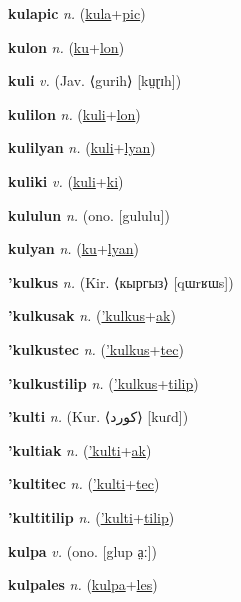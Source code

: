 \textbf{\hypertarget{kulapic}{kulapic}} \textit{n.} (\hyperlink{kula}{kula}+\allowbreak \hyperlink{pic}{pic})


\textbf{\hypertarget{kulon}{kulon}} \textit{n.} (\hyperlink{ku}{ku}+\allowbreak \hyperlink{lon}{lon})


\textbf{\hypertarget{kuli}{kuli}} \textit{v.} (Jav. ⟨gurih⟩ [kṳɽɪh])


\textbf{\hypertarget{kulilon}{kulilon}} \textit{n.} (\hyperlink{kuli}{kuli}+\allowbreak \hyperlink{lon}{lon})


\textbf{\hypertarget{kulilyan}{kulilyan}} \textit{n.} (\hyperlink{kuli}{kuli}+\allowbreak \hyperlink{lyan}{lyan})


\textbf{\hypertarget{kuliki}{kuliki}} \textit{v.} (\hyperlink{kuli}{kuli}+\allowbreak \hyperlink{ki}{ki})


\textbf{\hypertarget{kululun}{kululun}} \textit{n.} (ono. [gululu])


\textbf{\hypertarget{kulyan}{kulyan}} \textit{n.} (\hyperlink{ku}{ku}+\allowbreak \hyperlink{lyan}{lyan})


\textbf{\hypertarget{'kulkus}{'kulkus}} \textit{n.} (Kir. ⟨кыргыз⟩ [qɯrʁɯs])


\textbf{\hypertarget{'kulkusak}{'kulkusak}} \textit{n.} (\hyperlink{'kulkus}{'kulkus}+\allowbreak \hyperlink{ak}{ak})


\textbf{\hypertarget{'kulkustec}{'kulkustec}} \textit{n.} (\hyperlink{'kulkus}{'kulkus}+\allowbreak \hyperlink{tec}{tec})


\textbf{\hypertarget{'kulkustilip}{'kulkustilip}} \textit{n.} (\hyperlink{'kulkus}{'kulkus}+\allowbreak \hyperlink{tilip}{tilip})


\textbf{\hypertarget{'kulti}{'kulti}} \textit{n.} (Kur. ⟨{\arabics{}کورد‎}⟩ [kuɾd])


\textbf{\hypertarget{'kultiak}{'kultiak}} \textit{n.} (\hyperlink{'kulti}{'kulti}+\allowbreak \hyperlink{ak}{ak})


\textbf{\hypertarget{'kultitec}{'kultitec}} \textit{n.} (\hyperlink{'kulti}{'kulti}+\allowbreak \hyperlink{tec}{tec})


\textbf{\hypertarget{'kultitilip}{'kultitilip}} \textit{n.} (\hyperlink{'kulti}{'kulti}+\allowbreak \hyperlink{tilip}{tilip})


\textbf{\hypertarget{kulpa}{kulpa}} \textit{v.} (ono. [glup a̤ː])


\textbf{\hypertarget{kulpales}{kulpales}} \textit{n.} (\hyperlink{kulpa}{kulpa}+\allowbreak \hyperlink{les}{les})


